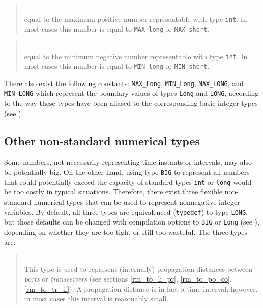 \begin{quote}
\noindent{}\\ \hspace{0in}
equal to the maximum positive number representable with type {\tt int}.
In most cases this number is equal to {\tt MAX\_long} or {\tt MAX\_short}.
\end{quote}

\begin{quote}
\noindent{}\\ \hspace{0in}
equal to the minimum negative number representable with type {\tt int}.
In most cases this number is equal to {\tt MIN\_long} or {\tt MIN\_short}.
\end{quote}\medskip

There also exist the following constants: {\tt MAX\_Long}, {\tt MIN\_Long},
{\tt MAX\_LONG}, and {\tt MIN\_LONG} which represent the boundary values of
types {\tt Long} and {\tt LONG}, according to the way these types have been
aliased to the corresponding basic integer types (see ).

\subsection {Other non-standard numerical types}
\label {rm_mp_ot}

Some numbers, not necessarily representing time instants or intervals,
may also be potentially big.
On the other hand, using type {\tt BIG} to represent all numbers that
could potentially exceed the capacity of standard types {\tt int} or
{\tt long} would be too costly in typical situations.
Therefore, there exist three flexible
non-standard numerical types that can be used
to represent nonnegative integer variables.
By default, all three types are equivalenced ({\tt typedef}) to type {\tt LONG},
but those defaults can be changed with compilation options
to {\tt BIG} or {\tt Long} (see ), depending on whether they are
too tight or still too wasteful.
The three types are:

\medskip

\begin{quote}
\noindent{}\\ \hspace{0in}
This type is used to represent (internally)
propagation distances between {\em ports\/} or {\em transceivers\/}
(see sections \ref{rm_to_li_pr}, \ref{rm_to_po_co}, \ref{rm_to_tr_if}).
A propagation distance is in fact a time interval; however, in most cases
this interval is reasonably small.
\end{quote}

